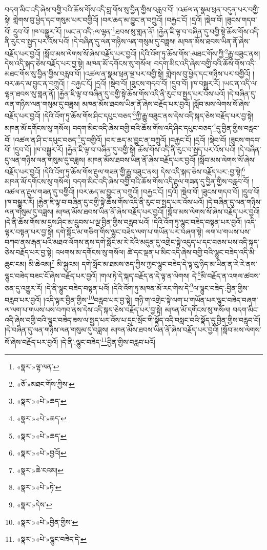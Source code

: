 བདག་མིང་འདི་ཞེས་བགྱི་བའི་ཆོས་གོས་འདི་བླ་གོས་སུ་བྱིན་གྱིས་བརླབ་བོ། །འཚལ་ན་སྣམ་ཕྲན་བདུན་པར་བགྱི་སྟེ། གླེགས་བུ་ཕྱེད་དང་གསུམ་པར་བགྱིའོ། །བར་ཆད་མ་བྱུང་ན་བཀྲུའོ། །བརྐྱང་ངོ། །དྲའོ། །སྡེབ་བོ། །ཟུངས་གདབ་བོ། དྲུབ་བོ། །ཁ་བསྒྱུར་རོ། །ཡང་ན་འདི་:ལ་ལྷན་\footnote{«སྣར་»ལྷ་ལན་}ཐབས་སུ་གླན་ནོ། །རྐྱེན་ཇི་ལྟ་བ་བཞིན་དུ་བགྱི་སྟེ་ཆོས་གོས་འདི་ནི་རུང་བ་སྤྱད་པར་འོས་པའོ། །དེ་བཞིན་དུ་ལན་གཉིས་ལན་གསུམ་དུ་བཟླས། མཁན་མོས་ཐབས་ཡིན་ནོ་ཞེས་བརྗོད་པར་བྱའོ། །སློབ་མས་ལེགས་སོ་ཞེས་བརྗོད་པར་བྱའོ། །དེའི་འོག་ཏུ་ཆོས་གོས་:མཐང་གོས་ཀྱི་\footnote{«ཅོ་»མཐང་གོས་ཀྱིས་}རྒྱུ་བཟུང་ནས། དེས་འདི་སྐད་ཅེས་བརྗོད་པར་བྱ་སྟེ། མཁན་མོ་དགོངས་སུ་གསོལ། བདག་མིང་འདི་ཞེས་བགྱི་བའི་ཆོས་གོས་འདི་མཐང་གོས་སུ་བྱིན་གྱིས་བརླབ་བོ། །འཚལ་ན་སྣམ་ཕྲན་ལྔ་པར་བགྱི་སྟེ། གླེགས་བུ་ཕྱེད་དང་གཉིས་པར་བགྱིའོ། །བར་ཆད་མ་བྱུང་ན་བཀྲུའོ། །
བརྐྱང་ངོ། །དྲའོ། །སྡེབ་བོ། །ཟུངས་གདབ་བོ། །དྲུབ་བོ། །ཁ་བསྒྱུར་རོ། །ཡང་ན་འདི་ལ་ལྷན་ཐབས་སུ་གླན་ནོ། །རྐྱེན་ཇི་ལྟ་བ་བཞིན་དུ་བགྱི་སྟེ་ཆོས་གོས་འདི་ནི་རུང་བ་སྤྱད་པར་འོས་པའོ། །དེ་བཞིན་དུ་ལན་གཉིས་ལན་གསུམ་དུ་བཟླས། མཁན་མོས་ཐབས་ཡིན་ནོ་ཞེས་བརྗོད་པར་བྱའོ། །སློབ་མས་ལེགས་སོ་ཞེས་བརྗོད་པར་བྱའོ། །དེའི་འོག་ཏུ་ཆོས་གོས་ཤིང་དཔུང་བཅད་\footnote{«སྣར་»«པེ་»ཆད་}ཀྱི་རྒྱུ་བཟུང་ནས་དེས་འདི་སྐད་ཅེས་བརྗོད་པར་བྱ་སྟེ། མཁན་མོ་དགོངས་སུ་གསོལ། བདག་མིང་འདི་ཞེས་བགྱི་བའི་ཆོས་གོས་འདི་ཤིང་དཔུང་བཅད་\footnote{«སྣར་»«པེ་»ཆད་}དུ་བྱིན་གྱིས་བརླབ་བོ། །འཚལ་ན་ཤི་ང་དཔུང་བཅད་\footnote{«སྣར་»«པེ་»ཆད་}དུ་བགྱིའོ། །བར་ཆད་མ་བྱུང་ན་བཀྲུའོ། །བརྐྱང་ངོ། །དྲའོ། །སྡེབ་བོ། །ཟུངས་གདབ་བོ། །དྲུབ་བོ། །ཁ་བསྒྱུར་རོ། །རྐྱེན་ཇི་ལྟ་བ་བཞིན་དུ་བགྱི་སྟེ། ཆོས་གོས་འདི་ནི་རུང་བ་སྤྱད་པར་འོས་པའོ། །དེ་བཞིན་དུ་ལན་གཉིས་ལན་གསུམ་དུ་བཟླས། མཁན་མོས་ཐབས་ཡིན་ནོ་ཞེས་བརྗོད་པར་བྱའོ། །སློབ་མས་ལེགས་སོ་ཞེས་བརྗོད་པར་བྱའོ། །དེའི་འོག་ཏུ་ཆོས་གོས་རྔུལ་གཟན་གྱི་རྒྱུ་བཟུང་ནས། དེས་འདི་སྐད་ཅེས་བརྗོད་པར་:བྱ་སྟེ།\footnote{«སྣར་»«པེ་»བྱའོ།} མཁན་མོ་དགོངས་སུ་གསོལ། བདག་མིང་འདི་ཞེས་བགྱི་བའི་ཆོས་གོས་འདི་རྔུལ་གཟན་དུ་བྱིན་གྱིས་བརླབ་བོ། །འཚལ་ན་རྔུལ་གཟན་དུ་བགྱིའོ། །བར་ཆད་མ་བྱུང་ན་བཀྲུའོ། །བརྐྱང་ངོ། །དྲའོ། །སྡེབ་བོ། །ཟུངས་གདབ་བོ། །དྲུབ་བོ། །ཁ་བསྒྱུར་རོ། །རྐྱེན་ཇི་ལྟ་བ་བཞིན་དུ་བགྱི་སྟེ་ཆོས་གོས་འདི་ནི་རུང་བ་སྤྱད་པར་འོས་པའོ། །དེ་བཞིན་དུ་ལན་གཉིས་ལན་གསུམ་དུ་བཟླས། མཁན་མོས་ཐབས་ཡིན་ནོ་ཞེས་བརྗོད་པར་བྱའོ། །སློབ་མས་ལེགས་སོ་ཞེས་བརྗོད་པར་བྱའོ། །དེ་ནི་ཆོས་གོས་མ་དྲས་ཤིང་མ་དྲུབས་པ་ལྔ་བྱིན་གྱིས་བརླབ་པའོ། །དེའི་འོག་ཏུ་ལྷུང་བཟེད་བསྟན་པར་བྱའོ། །འདི་ལྟར་བསྟན་པར་བྱ་སྟེ། དགེ་སློང་མ་གཅིག་གིས་ལྷུང་བཟེད་ལག་པ་གཡོན་པར་བཞག་སྟེ། ལག་པ་གཡས་པས་བཀབ་ནས་རྒན་པའི་མཐའ་ལོགས་ནས་དགེ་སློང་མ་རེ་རེའི་མདུན་དུ་འགྲེང་སྟེ་འདུད་པ་དང་བཅས་པས་འདི་སྐད་ཅེས་བརྗོད་པར་བྱ་སྟེ། འཕགས་མ་དགོངས་སུ་གསོལ། ཚེ་དང་ལྡན་པ་མིང་འདི་ཞེས་བགྱི་བའི་ལྷུང་བཟེད་འདི་མི་ཆུང་ངམ། མི་ཆེའམ།\footnote{«སྣར་»ཆེ་ངའམ།} མི་སྐྱའམ། དགེ་སློང་མ་ཐམས་ཅད་ཀྱིས་ཀྱང་ལྷུང་བཟེད་དེ་ལྟ་བུ་ཉིད་མ་ཡིན་ན་རེ་རེ་ནས་ལྷུང་བཟེད་བཟང་ངོ་ཞེས་བརྗོད་པར་བྱའོ། །གལ་ཏེ་དེ་སྐད་བརྗོད་ན་དེ་ལྟ་ན་ལེགས། དེ་\footnote{«སྣར་»«པེ་»ཏེ་}མི་བརྗོད་ན་འགལ་ཚབས་ཅན་དུ་འགྱུར་རོ། །དེ་ནི་ལྷུང་བཟེད་བསྟན་པའོ། །དེའི་འོག་ཏུ་མཁན་མོ་རང་གིས་དེ་\footnote{«སྣར་»དེས་}ལ་ལྷུང་བཟེད་:བྱིན་གྱིས་བརླབ་པར་བྱའོ། །འདི་ལྟར་བྱིན་གྱིས་\footnote{«སྣར་»«པེ་»བྱིན་གྱིས་}བརླབ་པར་བྱ་སྟེ། གཉི་ག་འགྲེང་སྟེ་ལག་པ་གཡོན་པར་ལྷུང་བཟེད་བཞག་ལ་ལག་པ་གཡས་པས་བཀབ་ནས་དེས་འདི་སྐད་ཅེས་བརྗོད་པར་བྱ་སྟེ། མཁན་མོ་དགོངས་སུ་གསོལ། བདག་མིང་འདི་ཞེས་བགྱི་བའི་ལྷུང་བཟེད་ཟས་ལ་སྤྱད་པར་འོས་པ་དྲང་སྲོང་གི་སྣོད་འདི་བསླང་བའི་སྣོད་དུ་བྱིན་གྱིས་བརླབ་བོ། །དེ་བཞིན་དུ་ལན་གཉིས་ལན་གསུམ་དུ་བཟླས། མཁན་མོས་ཐབས་ཡིན་ནོ་ཞེས་བརྗོད་པར་བྱའོ། །སློབ་མས་ལེགས་སོ་ཞེས་བརྗོད་པར་བྱའོ། །དེ་ནི་:ལྷུང་བཟེད་\footnote{«སྣར་»«པེ་»ལྷུང་བཟེད་དེ་}བྱིན་གྱིས་བརླབ་པའོ། 